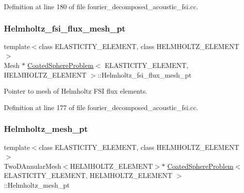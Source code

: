 Definition at line 180 of file fourier\+\_\+decomposed\+\_\+acoustic\+\_\+fsi.\+cc.

\mbox{\label{classCoatedSphereProblem_aef75017cfe8c77449e00f8f70aa4dcef}} 
\subsubsection{\texorpdfstring{Helmholtz\+\_\+fsi\+\_\+flux\+\_\+mesh\+\_\+pt}{Helmholtz\_fsi\_flux\_mesh\_pt}}
{\footnotesize\ttfamily template$<$class E\+L\+A\+S\+T\+I\+C\+I\+T\+Y\+\_\+\+E\+L\+E\+M\+E\+NT, class H\+E\+L\+M\+H\+O\+L\+T\+Z\+\_\+\+E\+L\+E\+M\+E\+NT$>$ \\
Mesh $\ast$ \hyperlink{classCoatedSphereProblem}{Coated\+Sphere\+Problem}$<$ E\+L\+A\+S\+T\+I\+C\+I\+T\+Y\+\_\+\+E\+L\+E\+M\+E\+NT, H\+E\+L\+M\+H\+O\+L\+T\+Z\+\_\+\+E\+L\+E\+M\+E\+NT $>$\+::Helmholtz\+\_\+fsi\+\_\+flux\+\_\+mesh\+\_\+pt\hspace{0.3cm}{\ttfamily [private]}}



Pointer to mesh of Helmholtz F\+SI flux elements. 



Definition at line 177 of file fourier\+\_\+decomposed\+\_\+acoustic\+\_\+fsi.\+cc.

\mbox{\label{classCoatedSphereProblem_a73e496c225b61138eca66e652e1c5d22}} 
\subsubsection{\texorpdfstring{Helmholtz\+\_\+mesh\+\_\+pt}{Helmholtz\_mesh\_pt}\hspace{0.1cm}{\footnotesize\ttfamily [1/3]}}
{\footnotesize\ttfamily template$<$class E\+L\+A\+S\+T\+I\+C\+I\+T\+Y\+\_\+\+E\+L\+E\+M\+E\+NT, class H\+E\+L\+M\+H\+O\+L\+T\+Z\+\_\+\+E\+L\+E\+M\+E\+NT$>$ \\
Two\+D\+Annular\+Mesh$<$H\+E\+L\+M\+H\+O\+L\+T\+Z\+\_\+\+E\+L\+E\+M\+E\+NT$>$$\ast$ \hyperlink{classCoatedSphereProblem}{Coated\+Sphere\+Problem}$<$ E\+L\+A\+S\+T\+I\+C\+I\+T\+Y\+\_\+\+E\+L\+E\+M\+E\+NT, H\+E\+L\+M\+H\+O\+L\+T\+Z\+\_\+\+E\+L\+E\+M\+E\+NT $>$\+::Helmholtz\+\_\+mesh\+\_\+pt\hspace{0.3cm}{\ttfamily [private]}}




